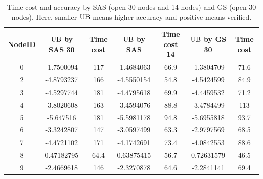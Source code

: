 %

\begin{table}
	\begin{tabular}{|c|c|c|c|c|c|c|}
		\hline
		NodeID & $\mathrm{UB}$ by SAS 30 & Time cost & $\mathrm{UB}$ by SAS & Time cost 14 & $\mathrm{UB}$ by GS 30 & Time cost \\
		\hline
		0 & -1.7500094 & 117 & -1.4684063 & 66.9 & -1.3804709 & 71.6 \\
		\hline
		2 & -4.8793237 & 166 & -4.5550154 & 54.8 & -4.5424599 & 84.9 \\
		\hline
		3 & -4.5297744 & 181 & -4.4795618 & 69.9 & -4.4459532 & 71.2 \\
		\hline
		4 & -3.8020608 & 163 & -3.4594076 & 88.8 & -3.4784499 & 113 \\
		\hline
		5 & -5.647516 & 181 & -5.5981178 & 94.8 & -5.6955818 & 93.7 \\
		\hline
		6 & -3.3242807 & 147 & -3.0597499 & 63.3 & -2.9797569 & 68.5 \\
		\hline
		7 & -4.4721102 & 171 & -4.1742691 & 73.4 & -4.0842553 & 88.6 \\
		\hline
		8 & 0.47182795 & 64.4 & 0.63875415 & 56.7 & 0.72631579 & 46.5 \\
		\hline
		9 & -2.4669618 & 146 & -2.3270878 & 64.6 & -2.2841141 & 69.4 \\
		\hline
	\end{tabular}
	\vspace*{1ex}
	 \caption{Time cost and accuracy by SAS (open 30 nodes and 14 nodes) and GS (open 30 nodes). Here, smaller $\mathrm{UB}$ means higher accuracy and positive means verified.}
\end{table}



